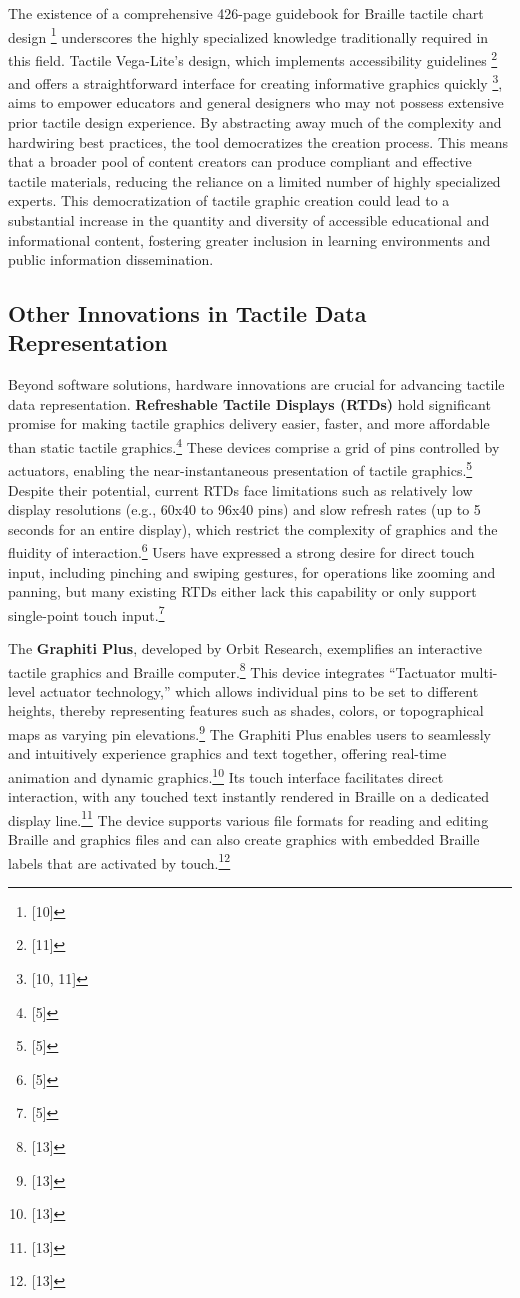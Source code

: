 The existence of a comprehensive 426-page guidebook for Braille tactile chart design \footnote{[10]} underscores the highly specialized knowledge traditionally required in this field. Tactile Vega-Lite's design, which implements accessibility guidelines \footnote{[11]} and offers a straightforward interface for creating informative graphics quickly \footnote{[10, 11]}, aims to empower educators and general designers who may not possess extensive prior tactile design experience. By abstracting away much of the complexity and hardwiring best practices, the tool democratizes the creation process. This means that a broader pool of content creators can produce compliant and effective tactile materials, reducing the reliance on a limited number of highly specialized experts. This democratization of tactile graphic creation could lead to a substantial increase in the quantity and diversity of accessible educational and informational content, fostering greater inclusion in learning environments and public information dissemination.

\subsection{Other Innovations in Tactile Data Representation}
Beyond software solutions, hardware innovations are crucial for advancing tactile data representation. \textbf{Refreshable Tactile Displays (RTDs)} hold significant promise for making tactile graphics delivery easier, faster, and more affordable than static tactile graphics.\footnote{[5]} These devices comprise a grid of pins controlled by actuators, enabling the near-instantaneous presentation of tactile graphics.\footnote{[5]} Despite their potential, current RTDs face limitations such as relatively low display resolutions (e.g., 60x40 to 96x40 pins) and slow refresh rates (up to 5 seconds for an entire display), which restrict the complexity of graphics and the fluidity of interaction.\footnote{[5]} Users have expressed a strong desire for direct touch input, including pinching and swiping gestures, for operations like zooming and panning, but many existing RTDs either lack this capability or only support single-point touch input.\footnote{[5]}

The \textbf{Graphiti Plus}, developed by Orbit Research, exemplifies an interactive tactile graphics and Braille computer.\footnote{[13]} This device integrates ``Tactuator\texttrademark{} multi-level actuator technology,'' which allows individual pins to be set to different heights, thereby representing features such as shades, colors, or topographical maps as varying pin elevations.\footnote{[13]} The Graphiti Plus enables users to seamlessly and intuitively experience graphics and text together, offering real-time animation and dynamic graphics.\footnote{[13]} Its touch interface facilitates direct interaction, with any touched text instantly rendered in Braille on a dedicated display line.\footnote{[13]} The device supports various file formats for reading and editing Braille and graphics files and can also create graphics with embedded Braille labels that are activated by touch.\footnote{[13]}

